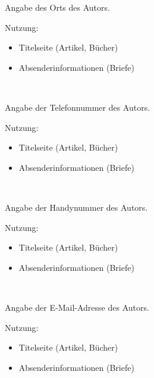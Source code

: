 \DescribeMacro{\ort}
Angabe des Orts des Autors.

Nutzung:
\begin{itemize}
	\item Titelseite (Artikel, Bücher)
	\item Absenderinformationen (Briefe)
\end{itemize}

\begin{nutzung}
		\>\\
	\beispiel
		\>
\end{nutzung}

\DescribeMacro{\telefon}
Angabe der Telefonnummer des Autors.

Nutzung:
\begin{itemize}
	\item Titelseite (Artikel, Bücher)
	\item Absenderinformationen (Briefe)
\end{itemize}

\begin{nutzung}
		\>\\
	\beispiel
		\>
\end{nutzung}

\DescribeMacro{\handy}
Angabe der Handynummer des Autors.

Nutzung:
\begin{itemize}
	\item Titelseite (Artikel, Bücher)
	\item Absenderinformationen (Briefe)
\end{itemize}

\begin{nutzung}
		\>\\
	\beispiel
		\>
\end{nutzung}

\DescribeMacro{\email}
Angabe der E-Mail-Adresse des Autors.

Nutzung:
\begin{itemize}
	\item Titelseite (Artikel, Bücher)
	\item Absenderinformationen (Briefe)
\end{itemize}

\begin{nutzung}
		\>\\
	\beispiel
		\>
\end{nutzung}

